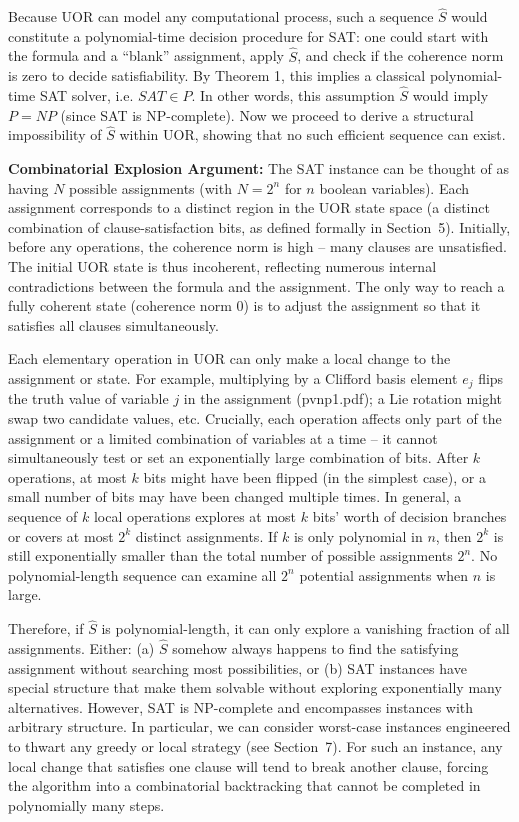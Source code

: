 \documentclass{article}
\begin{document}
Because UOR can model any computational process, such a sequence $\hat{S}$ would constitute a polynomial-time decision procedure for SAT: one could start with the formula and a “blank” assignment, apply $\hat{S}$, and check if the coherence norm is zero to decide satisfiability. By Theorem 1, this implies a classical polynomial-time SAT solver, i.e. $SAT \in P$. In other words, this assumption $\hat{S}$ would imply $P=NP$ (since SAT is NP-complete). Now we proceed to derive a structural impossibility of $\hat{S}$ within UOR, showing that no such efficient sequence can exist.

\medskip
\textbf{Combinatorial Explosion Argument:} The SAT instance can be thought of as having $N$ possible assignments (with $N = 2^n$ for $n$ boolean variables). Each assignment corresponds to a distinct region in the UOR state space (a distinct combination of clause-satisfaction bits, as defined formally in Section~5). Initially, before any operations, the coherence norm is high – many clauses are unsatisfied. The initial UOR state is thus incoherent, reflecting numerous internal contradictions between the formula and the assignment. The only way to reach a fully coherent state (coherence norm $0$) is to adjust the assignment so that it satisfies all clauses simultaneously.

Each elementary operation in UOR can only make a local change to the assignment or state. For example, multiplying by a Clifford basis element $e_j$ flips the truth value of variable $j$ in the assignment (pvnp1.pdf); a Lie rotation might swap two candidate values, etc. Crucially, each operation affects only part of the assignment or a limited combination of variables at a time – it cannot simultaneously test or set an exponentially large combination of bits. After $k$ operations, at most $k$ bits might have been flipped (in the simplest case), or a small number of bits may have been changed multiple times. In general, a sequence of $k$ local operations explores at most $k$ bits’ worth of decision branches or covers at most $2^k$ distinct assignments. If $k$ is only polynomial in $n$, then $2^k$ is still exponentially smaller than the total number of possible assignments $2^n$. No polynomial-length sequence can examine all $2^n$ potential assignments when $n$ is large.

Therefore, if $\hat{S}$ is polynomial-length, it can only explore a vanishing fraction of all assignments. Either: (a) $\hat{S}$ somehow always happens to find the satisfying assignment without searching most possibilities, or (b) SAT instances have special structure that make them solvable without exploring exponentially many alternatives. However, SAT is NP-complete and encompasses instances with arbitrary structure. In particular, we can consider worst-case instances engineered to thwart any greedy or local strategy (see Section~7). For such an instance, any local change that satisfies one clause will tend to break another clause, forcing the algorithm into a combinatorial backtracking that cannot be completed in polynomially many steps.
\end{document}
